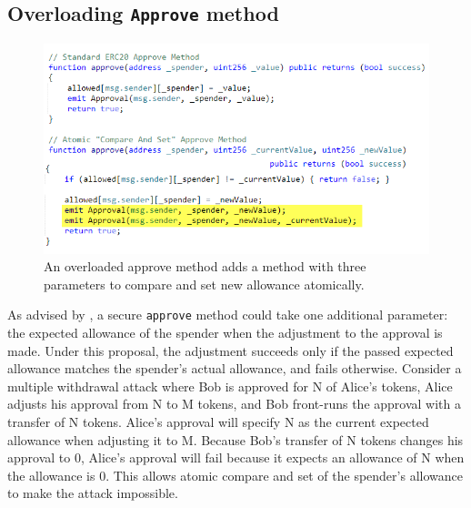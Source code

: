 
\subsection{Overloading \texttt{Approve} method}
\label{sec:overload}


\begin{figure}[t]
	\centering
	\includegraphics[width=1.0\linewidth]{figures/multiple_withdrawal_12.png}
	\caption{An overloaded approve method adds a method with three parameters to compare and set new allowance atomically.\label{fig:api}}
\end{figure}

As advised by \cite{Ref03}, a secure \texttt{approve} method could take one additional parameter: the expected allowance of the spender when the adjustment to the approval is made. Under this proposal, the adjustment succeeds only if the passed expected allowance matches the spender's actual allowance, and fails otherwise. Consider a multiple withdrawal attack where Bob is approved for N of Alice's tokens, Alice adjusts his approval from N to M tokens, and Bob front-runs the approval with a transfer of N tokens. Alice's approval will specify N as the current expected allowance when adjusting it to M. Because Bob's transfer of N tokens changes his approval to 0, Alice's approval will fail because it expects an allowance of N when the allowance is 0. This allows atomic compare and set of the spender's allowance to make the attack impossible. 

